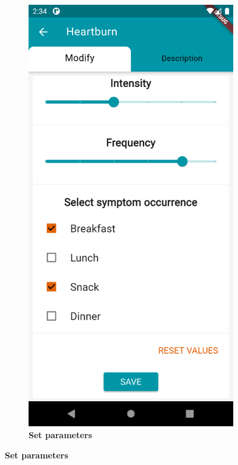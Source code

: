 \documentclass [12pt]{article}
\begin{document}
\begin{description}[leftmargin=1cm,rightmargin=1cm]
\begin{figure}[h!]
\begin{subfigure}[tr]{0.3\linewidth}
\includegraphics[width=\linewidth]{addSymptom3.PNG}
\caption{\textbf{Set parameters}}
\end{subfigure}

\end{figure}
\end{description}
\end{document}
